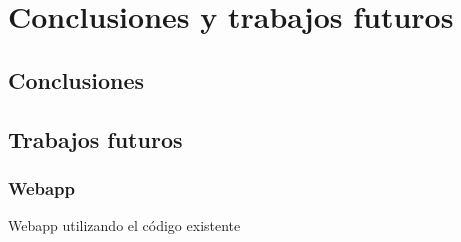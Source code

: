 \chapter{Conclusiones y trabajos futuros}

\section{Conclusiones}


\section{Trabajos futuros}

\subsection{Webapp}
Webapp utilizando el código existente
